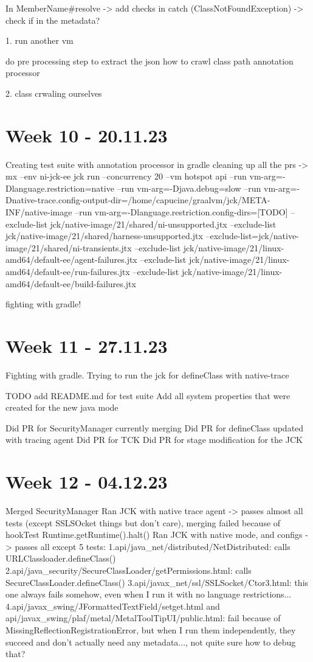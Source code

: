 In MemberName#resolve -> add checks in catch (ClassNotFoundException) -> check if in the metadata?


1. run another vm

do pre processing step to extract the json
how to crawl class path 
annotation processor

2. class crwaling ourselves

\section{Week 10 - 20.11.23}

Creating test suite with annotation processor in gradle
cleaning up all the prs
->
mx --env ni-jck-ee jck run --concurrency 20 --vm hotspot api --run vm-arg=-Dlanguage.restriction=native --run vm-arg=-Djava.debug=slow --run vm-arg=-Dnative-trace.config-output-dir=/home/capucine/graalvm/jck/META-INF/native-image --run vm-arg=-Dlanguage.restriction.config-dirs=[TODO]  --exclude-list jck/native-image/21/shared/ni-unsupported.jtx --exclude-list jck/native-image/21/shared/harness-unsupported.jtx --exclude-list=jck/native-image/21/shared/ni-transients.jtx --exclude-list jck/native-image/21/linux-amd64/default-ee/agent-failures.jtx  --exclude-list jck/native-image/21/linux-amd64/default-ee/run-failures.jtx  --exclude-list jck/native-image/21/linux-amd64/default-ee/build-failures.jtx

fighting with gradle!
\section{Week 11 - 27.11.23}
Fighting with gradle. Trying to run the jck for defineClass with native-trace

TODO add README.md for test suite
Add all system properties that were created for the new java mode

Did PR for SecurityManager currently merging
Did PR for defineClass updated with tracing agent
Did PR for TCK
Did PR for stage modification for the JCK

\section{Week 12 - 04.12.23}
Merged SecurityManager
Ran JCK with native trace agent -> passes almost all tests (except SSLSOcket things but don't care), merging failed because of hookTest Runtime.getRuntime().halt()
Ran JCK with native mode, and configs -> passes all except 5 tests:
1.api/java\_net/distributed/NetDistributed: calls URLClassloader.defineClass()
2.api/java\_security/SecureClassLoader/getPermissions.html: calls SecureClassLoader.defineClass()
3.api/javax\_net/ssl/SSLSocket/Ctor3.html: this one always fails somehow, even when I run it with no language restrictions...
4.api/javax\_swing/JFormattedTextField/setget.html and api/javax\_swing/plaf/metal/MetalToolTipUI/public.html: fail because of MissingReflectionRegistrationError, but when I run them independently, they succeed and don't actually need any metadata..., not quite sure how to debug that?

